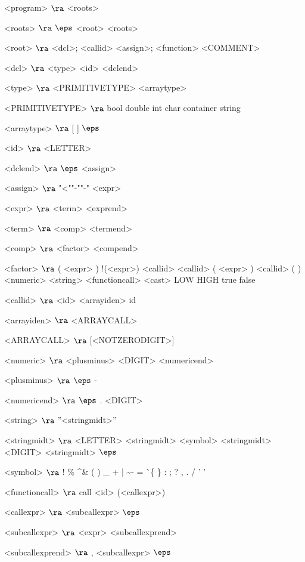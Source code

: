 \begin{grammar}
<program> $\ra$ <roots>

<roots> $\ra$ $\eps$
\alt <root> <roots>
 
<root> $\ra$ <dcl>;
\alt <callid> <assign>;
\alt <function>
\alt <COMMENT>

<dcl> $\ra$ <type> <id> <dclend>

<type> $\ra$ <PRIMITIVETYPE> <arraytype>

<PRIMITIVETYPE> $\ra$ bool
\alt double
\alt int
\alt char
\alt container
\alt string

<arraytype> $\ra$ [ ]
\alt$\eps$

<id> $\ra$ <LETTER>

<dclend> $\ra$ $\eps$
\alt <assign> 

<assign> $\ra$ "<""-""-" <expr>

<expr> $\ra$ <term> <exprend>

<term> $\ra$ <comp> <termend>

<comp> $\ra$ <factor> <compend>

<factor> $\ra$ ( <expr> )
	\alt !(<expr>)
	\alt <callid>
	\alt <callid> ( <expr> )
	\alt <callid> ( )
	\alt <numeric>
	\alt <string>
	\alt <functioncall> 
	\alt <cast>
	\alt LOW
	\alt HIGH
	\alt true
	\alt false

<callid> $\ra$ <id> <arrayiden>
\alt id

<arrayiden> $\ra$ <ARRAYCALL>

<ARRAYCALL> $\ra$ [<NOTZERODIGIT>]

<numeric> $\ra$ <plusminus> <DIGIT> <numericend>

<plusminus> $\ra$ $\eps$
	\alt -

<numericend> $\ra$ $\eps$
\alt . <DIGIT>

<string> $\ra$ ''<stringmidt>''

<stringmidt> $\ra$ <LETTER> <stringmidt>
\alt <symbol> <stringmidt>
\alt <DIGIT> <stringmidt>
\alt$\eps$

<symbol> $\ra$ !
\alt \%
\alt \^
\alt \&
\alt (
\alt )
\alt \_
\alt +
\alt |
\alt \~
\alt -
\alt =
\alt \`
\alt \{
\alt \}
\alt [
\alt ]
\alt :
\alt ;
\alt ?
\alt ,
\alt .
\alt /
\alt ' '

<functioncall> $\ra$ call <id> (<callexpr>)

<callexpr> $\ra$ <subcallexpr>
\alt$\eps$

<subcallexpr> $\ra$ <expr> <subcallexprend>

<subcallexprend> $\ra$ , <subcallexpr>
\alt$\eps$


\end{grammar}
